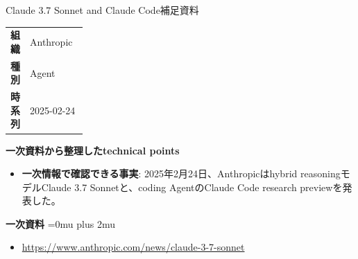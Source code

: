 \begin{technicalnote}{Claude 3.7 Sonnet and Claude Code}{補足資料}
\begingroup
\begin{tabularx}{\linewidth}{@{}>{\bfseries}p{0.22\linewidth}X@{}}
組織 & Anthropic \\
種別 & Agent \\
時系列 & 2025-02-24 \\
\end{tabularx}
\smallskip
\begin{minipage}{\linewidth}
{\bfseries 一次資料から整理したtechnical points}
\begin{itemize}[leftmargin=1.5em,itemsep=0.35em]
\item \textbf{一次情報で確認できる事実}: 2025年2月24日、Anthropicはhybrid reasoningモデルClaude 3.7 Sonnetと、coding AgentのClaude Code research previewを発表した。
\end{itemize}
\begin{samepage}
{\bfseries 一次資料}
\begingroup\sloppy
\Urlmuskip=0mu plus 2mu\relax
\begin{itemize}[leftmargin=1.5em,itemsep=0.25em]
\item {\scriptsize\url{https://www.anthropic.com/news/claude-3-7-sonnet}}
\end{itemize}
\endgroup
\end{samepage}
\end{minipage}
\endgroup
\end{technicalnote}
\medskip

